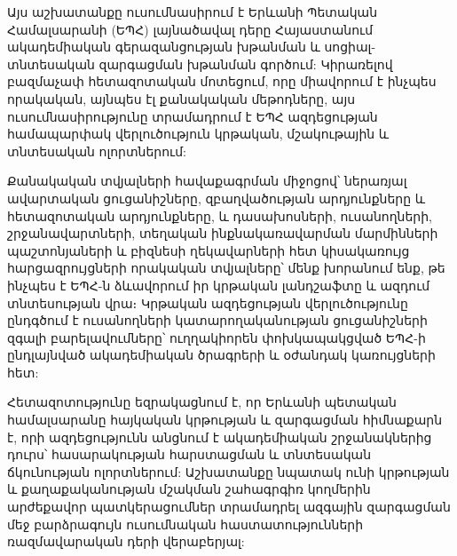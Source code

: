 \setmainfont{DejaVu Sans}
\fontsize{12}{12}\selectfont


\vspace{0.5cm}


\vspace{0.5cm}


\vspace{0.5cm}


\vfill


\vspace{0.5cm}

Այս աշխատանքը ուսումնասիրում է Երևանի Պետական Համալսարանի (ԵՊՀ) լայնածավալ դերը Հայաստանում ակադեմիական գերազանցության խթանման և սոցիալ-տնտեսական զարգացման խթանման գործում: Կիրառելով բազմաչափ հետազոտական մոտեցում, որը միավորում է ինչպես որակական, այնպես էլ քանակական մեթոդները, այս ուսումնասիրությունը տրամադրում է ԵՊՀ ազդեցության համապարփակ վերլուծություն կրթական, մշակութային և տնտեսական ոլորտներում:

Քանակական տվյալների հավաքագրման միջոցով՝ ներառյալ ավարտական ցուցանիշները, զբաղվածության արդյունքները և հետազոտական արդյունքները, և դասախոսների, ուսանողների, շրջանավարտների, տեղական ինքնակառավարման մարմինների պաշտոնյաների և բիզնեսի ղեկավարների հետ կիսակառույց հարցազրույցների որակական տվյալները՝ մենք խորանում ենք, թե ինչպես է ԵՊՀ-ն ձևավորում իր կրթական լանդշաֆտը և ազդում տնտեսության վրա։ Կրթական ազդեցության վերլուծությունը ընդգծում է ուսանողների կատարողականության ցուցանիշների զգալի բարելավումները՝ ուղղակիորեն փոխկապակցված ԵՊՀ-ի ընդլայնված ակադեմիական ծրագրերի և օժանդակ կառույցների հետ:

Հետազոտությունը եզրակացնում է, որ Երևանի պետական համալսարանը հայկական կրթության և զարգացման հիմնաքարն է, որի ազդեցությունն անցնում է ակադեմիական շրջանակներից դուրս՝ հասարակության հարստացման և տնտեսական ճկունության ոլորտներում: Աշխատանքը նպատակ ունի կրթության և քաղաքականության մշակման շահագրգիռ կողմերին արժեքավոր պատկերացումներ տրամադրել ազգային զարգացման մեջ բարձրագույն ուսումնական հաստատությունների ռազմավարական դերի վերաբերյալ:

\thispagestyle{empty}
\pagebreak

